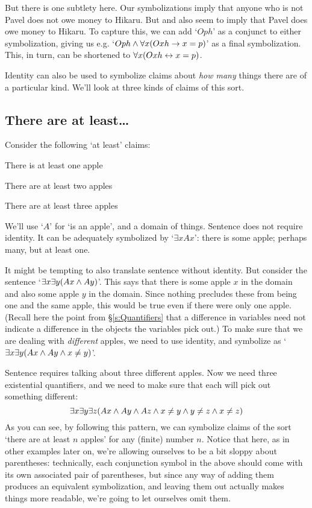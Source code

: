 But there is one subtlety here.   Our symbolizations imply that anyone who is not Pavel does not owe money to Hikaru.  But  and  also seem to imply that Pavel does owe money to Hikaru.  To capture this, we can add `$Oph$' as a conjunct to either symbolization, giving us e.g. `$Oph \wedge \forall x (Oxh \rightarrow x = p)$' as a final symbolization. This, in turn, can be shortened to $\forall x(Oxh \leftrightarrow x=p)$.


Identity can also be used to symbolize claims about \emph{how many} things there are of a particular kind.  We'll look at three kinds of claims of this sort.

\subsection{There are at least\ldots}
Consider the following `at least' claims:
\begin{earg}
\item[\ex{atleast1}] There is at least one apple
\item[\ex{atleast2}] There are at least two apples
\item[\ex{atleast3}] There are at least three apples
\end{earg}
We'll use `$A$' for `\blank is an apple', and a domain of things.  Sentence  does not require identity. It can be adequately symbolized by `$\exists x Ax$': there is some apple; perhaps many, but at least one.

It might be tempting to also translate sentence  without identity. But consider the sentence `$\exists x \exists y(Ax \wedge Ay)$'. This says that there is some apple $x$ in the domain and also some apple $y$ in the domain. Since nothing precludes these from being one and the same apple, this would be true even if there were only one apple.  (Recall here the point from \S\ref{s:Quantifiers} that a difference in variables need not indicate a difference in the objects the variables pick out.) To make sure that we are dealing with \emph{different} apples, we need to use identity, and symbolize  as  `$\exists x \exists y(Ax \wedge Ay \wedge x \neq y)$'.

Sentence  requires talking about three different apples. Now we need three existential quantifiers, and we need to make sure that each will pick out something different: $$\exists x \exists y\exists z(Ax \wedge Ay \wedge Az \wedge x \neq y \wedge y \neq z \wedge x \neq z)$$ As you can see, by following this pattern, we can symbolize claims of the sort `there are at least $n$ apples' for any (finite) number $n$.  Notice that here, as in other examples later on, we're allowing ourselves to be a bit sloppy about parentheses: technically, each conjunction symbol in the above should come with its own associated pair of parentheses, but since any way of adding them produces an equivalent symbolization, and leaving them out actually makes things more readable, we're going to let ourselves omit them.

